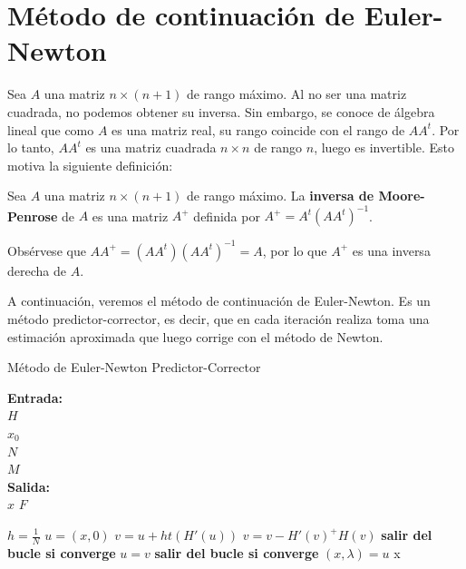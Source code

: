 \section{Método de continuación de Euler-Newton}

Sea $A$ una matriz $n\times(n+1)$ de rango máximo. Al no ser una matriz cuadrada, no podemos obtener su inversa. Sin embargo, se conoce de álgebra lineal que como $A$ es una matriz real, su rango coincide con el rango de $AA^t$. Por lo tanto, $AA^t$ es una matriz cuadrada $n\times n$ de rango $n$, luego es invertible. Esto motiva la siguiente definición: 

\begin{definition}
	Sea $A$ una matriz $n\times(n+1)$ de rango máximo. La \textbf{inversa de Moore-Penrose} de $A$ es una matriz $A^+$ definida por $A^+=A^t(AA^t)^{-1}$.
\end{definition}

Obsérvese que $AA^+=(AA^t)(AA^t)^{-1}=A$, por lo que $A^+$ es una inversa derecha de $A$.

A continuación, veremos el método de continuación de Euler-Newton. Es un método predictor-corrector, es decir, que en cada iteración realiza toma una estimación aproximada que luego corrige con el método de Newton.

\begin{algorithm}[H]
	\caption{Método de Euler-Newton Predictor-Corrector}
	\textbf{Entrada: } \\
	\hspace*{\algorithmicindent} $H$  \\
	\hspace*{\algorithmicindent} $x_0$  \\
	\hspace*{\algorithmicindent} $N$  \\
	\hspace*{\algorithmicindent} $M$  \\
	\textbf{Salida:} \\
	\hspace*{\algorithmicindent} $x$  $F$
	\begin{algorithmic}
		\Procedure {}{}
		\State $h = \frac{1}{N}$ 
		\State $u = (x,0)$
			\State $v = u + ht(H'(u))$ 
			 
				\State $v = v - H'(v)^+H(v)$
				\State \textbf{salir del bucle si converge}
			\EndFor
			\State $u = v$
			\State \textbf{salir del bucle si converge}
		\EndFor
		$(x, \lambda) = u$
		\State \Return x 
		\EndProcedure
	\end{algorithmic}
\end{algorithm}

